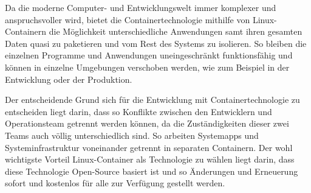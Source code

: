 
Da die moderne Computer- und Entwicklungswelt immer komplexer und anspruchsvoller wird, bietet die Containertechnologie mithilfe von Linux-Containern die Möglichkeit unterschiedliche Anwendungen samt ihren gesamten Daten quasi zu paketieren und vom Rest des Systems zu isolieren. So bleiben die einzelnen Programme und Anwendungen uneingeschränkt funktionsfähig und können in einzelne Umgebungen verschoben werden, wie zum Beispiel in der Entwicklung oder der Produktion. \cite{Container}

Der entscheidende Grund sich für die Entwicklung mit Containertechnologie zu entscheiden liegt darin, dass so Konflikte zwischen den Entwicklern und Operationsteam getrennt werden können, da die Zuständigkeiten dieser zwei Teams auch völlig unterschiedlich sind. So arbeiten Systemapps und Systeminfrastruktur voneinander getrennt in separaten Containern. Der wohl wichtigste Vorteil Linux-Container als Technologie zu wählen liegt darin, dass diese Technologie Open-Source basiert ist und so Änderungen und Erneuerung sofort und kostenlos für alle zur Verfügung gestellt werden. \cite{Container}
